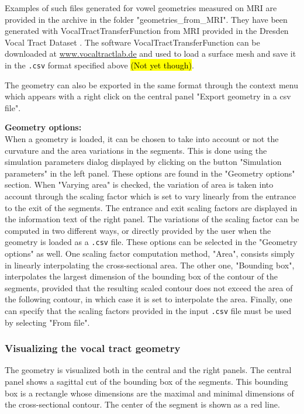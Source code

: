 \documentclass[]{article}
\begin{document}
	Examples of such files generated for vowel geometries measured on \ac{MRI} are provided in the archive in the folder "geometries\_from\_MRI". 
	They have been generated with VocalTractTransferFunction from \ac{MRI} provided in the
	Dresden Vocal Tract Dataset \cite{birkholz2020printable}.
	The software VocalTractTransferFunction can be downloaded at 
	\url{www.vocaltractlab.de} and used to load a surface mesh and save it in the 
	\texttt{.csv} format specified above \hl{(Not yet though)}.

	The geometry can also be exported in the same format through 
	the context menu which appears with a right click on the central panel
	"Export geometry in a csv file". 
	
	\textbf{Geometry options:}\\
	When a geometry is loaded,
	it can be chosen to take into account or not the curvature and 
	the area variations in the segments. This is done using the 
	simulation parameters dialog displayed by clicking on the 
	button "Simulation parameters" in the left panel. 
	These options are found in the "Geometry options" section.
	When "Varying area" is checked, the variation of area is taken into 
	account through the scaling factor which is set to vary linearly
	from the entrance to the exit of the segments.
	The entrance and exit scaling factors are displayed in the 
	information text of the right panel.
	The variations of the scaling factor can be computed in two different
	ways, or directly provided by the user when the geometry is loaded 
	as a \texttt{.csv} file. These options can be selected in the 
	"Geometry options" as well. One scaling factor computation method, 
	"Area", 
	consists simply in linearly interpolating the cross-sectional area.
	The other one, "Bounding box", interpolates the largest dimension of the bounding 
	box of the contour of the segments, provided that the resulting scaled contour 
	does not exceed the area of the following contour, in which case it 
	is set to interpolate the area. 
	Finally, one can specify that the scaling factors provided in the 
	input \texttt{.csv} file must be used by selecting "From file".
	

	\subsubsection{Visualizing the vocal tract geometry}
	
	The geometry is visualized both in the central and the right panels.
	The central panel shows a sagittal cut of the bounding box of the 
	segments. This bounding box is a rectangle whose dimensions are 
	the maximal and minimal dimensions of the cross-sectional 
	contour. The center of the segment is shown as a red line.
	
\end{document}
